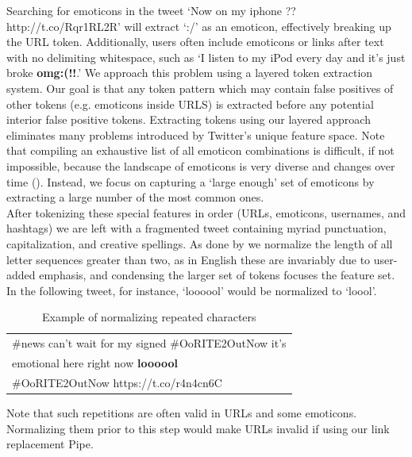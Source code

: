 \documentclass[letterpaper]{article}
\begin{document}
Searching for emoticons in the tweet `Now on my iphone ?? http://t.co/Rqr1RL2R' will extract `:/' as an emoticon, effectively breaking up the URL token. Additionally, users often include emoticons or links after text with no delimiting whitespace, such as `I listen to my iPod every day and it's just broke \textbf{omg:(!!}.' We approach this problem using a layered token extraction system. Our goal is that any token pattern which may contain false positives of other tokens (e.g. emoticons inside URLS) is extracted before any potential interior false positive tokens. Extracting tokens using our layered approach eliminates many problems introduced by Twitter's unique feature space. Note that compiling an exhaustive list of all emoticon combinations is difficult, if not impossible, because the landscape of emoticons is very diverse and changes over time (\citeauthor{Laboreiro:2010:TMM:1871840.1871853}). Instead, we focus on capturing a `large enough' set of emoticons by extracting a large number of the most common ones. \\

After tokenizing these special features in order (URLs, emoticons, usernames, and hashtags) we are left with a fragmented tweet containing myriad punctuation, capitalization, and creative spellings. As done by \citet{potts2011} we normalize the length of all letter sequences greater than two, as in English these are invariably due to user-added emphasis, and condensing the larger set of tokens focuses the feature set. In the following tweet, for instance, `loooool' would be normalized to `loool'.
\begin{table}[h]
\centering
\begin{tabular}{|l|}
	\hline
	\#news can't wait for my signed \#OoRITE2OutNow it's \\ emotional here right now \textbf{loooool} \\ \#OoRITE2OutNow https://t.co/r4n4cn6C \\
	\hline
\end{tabular}
\caption{Example of normalizing repeated characters}
\label{tab:normalize_characters_example}
\end{table}

Note that such repetitions are often valid in URLs and some emoticons. Normalizing them prior to this step would make URLs invalid if using our link replacement Pipe.
\end{document}
